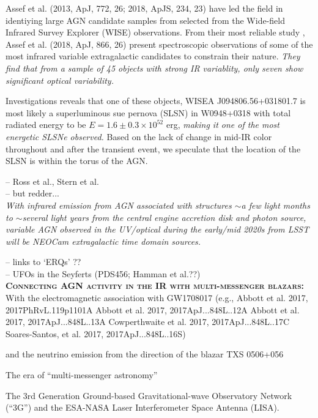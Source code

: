 \documentclass[12pt]{article}
\begin{document}
\smallskip
\smallskip
\noindent
Assef et al. (2013, ApJ, 772, 26; 2018, ApJS, 234, 23) have led the field in identiying large AGN candidate samples from selected from the Wide-field Infrared Survey Explorer (WISE) observations. 
From their most reliable study , Assef et al. (2018, ApJ, 866, 26) present spectroscopic observations of some of the most infrared variable extragalactic candidates to constrain their nature. {\it They find that from a sample of 45 objects with strong IR variablity, only seven show significant optical variability.}  

Investigations reveals that one of these objects, WISEA J094806.56+031801.7  is most likely a superluminous sue
pernova (SLSN) in W0948+0318 with total radiated energy to be $E=1.6\pm0.3 \times 10^{52}$ erg, {\it making it one of the most energetic SLSNe observed.} Based on the lack of change in mid-IR color throughout and after the transient event, we speculate that the location of the SLSN is within the torus of the AGN. 

\smallskip
\smallskip
\noindent
-- Ross et al., Stern et al. \\
-- but redder...\\

{\it With infrared emission from AGN associated with structures $\sim$a few light months to $\sim$several light years from the central engine accretion disk and photon source, variable AGN observed in the UV/optical during the early/mid 2020s from LSST will be NEOCam extragalactic time domain sources.}


\smallskip
\smallskip
\noindent
-- links to `ERQs' ?? \\
-- UFOs in the Seyferts (PDS456; Hamman et al.??) \\

\smallskip
\smallskip
\noindent
\textbf{\textsc{Connecting AGN activity in the IR with multi-messenger blazars: }}
With the electromagnetic association with GW1708017 (e.g., 
Abbott et al. 2017,  2017PhRvL.119p1101A	
Abbott et al. 2017,  2017ApJ...848L..12A	
Abbott et al. 2017,  2017ApJ...848L..13A	
Cowperthwaite et al. 2017,  2017ApJ...848L..17C	
Soares-Santos, et al. 2017,  2017ApJ...848L..16S)	

and the neutrino emission from the direction of the blazar TXS 0506+056

The era of ``multi-messenger astronomy'' 

The 3rd Generation Ground-based Gravitational-wave Observatory Network
(``3G'') and the ESA-NASA Laser Interferometer Space Antenna (LISA). 
\end{document}
